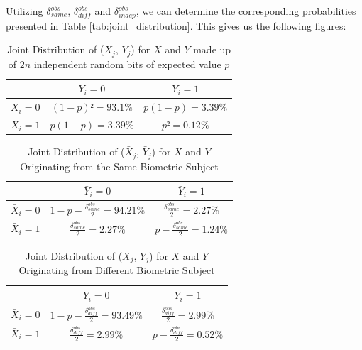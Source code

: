 Utilizing \(\delta_{same}^{obs}\), \(\delta_{diff}^{obs}\) and \(\delta_{indep}^{obs}\), we can determine the corresponding probabilities presented in Table \ref{tab:joint_distribution}. This gives us the following figures:


\begin{table}[H]
    \centering
    \renewcommand{\arraystretch}{1.5}
    \begin{tabular}{|c|c|c|}
        \hline
        & $Y_i = 0$ & $Y_i = 1$\\
        \hline
        $X_i = 0$ & $(1-p)² = 93.1\% $ & $p(1-p) = 3.39\%$\\
        \hline
        $X_i = 1$ & $p(1-p) = 3.39\% $ & $p² = 0.12\%$\\
        \hline
    \end{tabular}
    \caption{Joint Distribution of ($X_j$, $Y_j$) for \(X\) and \(Y\) made up of \(2n\) independent random bits of expected value \(p\)}
    \label{tab:joint_distribution_deltaindep}
\end{table}


\begin{table}[H]
    \centering
    \renewcommand{\arraystretch}{1.5}
    \begin{tabular}{|c|c|c|}
        \hline
        & $\bar{Y}_i = 0$ & $\bar{Y}_i = 1$\\
        \hline
        $\bar{X}_i = 0$ & $1 - p - \frac{\delta_{same}^{obs}}{2} = 94.21\% $ & $\frac{\delta_{same}^{obs}}{2} = 2.27\%$\\
        \hline
        $\bar{X}_i = 1$ & $\frac{\delta_{same}^{obs}}{2} = 2.27\%$ & $p - \frac{\delta_{same}^{obs}}{2} = 1.24\%$\\
        \hline
    \end{tabular}
    \caption{Joint Distribution of ($\bar{X}_j$, $\bar{Y}_j$) for \(X\) and \(Y\)  Originating from the Same Biometric Subject}
    \label{tab:joint_distribution_deltasame}
\end{table}

\begin{table}[H]
    \centering
    \renewcommand{\arraystretch}{1.5}
    \begin{tabular}{|c|c|c|}
        \hline
        & $\bar{Y}_i = 0$ & $\bar{Y}_i = 1$\\
        \hline
        $\bar{X}_i = 0$ & $1 - p - \frac{\delta_{diff}^{obs}}{2} = 93.49\% $ & $\frac{\delta_{diff}^{obs}}{2} = 2.99\%$\\
        \hline
        $\bar{X}_i = 1$ & $\frac{\delta_{diff}^{obs}}{2} = 2.99\%$ & $p - \frac{\delta_{diff}^{obs}}{2} = 0.52\%$\\
        \hline
    \end{tabular}
    \caption{Joint Distribution of ($\bar{X}_j$, $\bar{Y}_j$) for \(X\) and \(Y\) Originating from Different Biometric Subject}
    \label{tab:joint_distribution_deltadiff}
\end{table}








